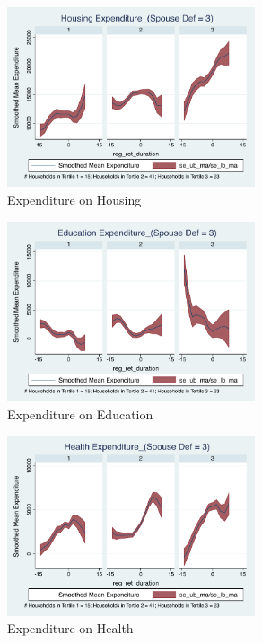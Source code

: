 \documentclass[11pt,onecolumn]{article}
\numberwithin{figure}{section}
\begin{document}
\clearpage

\begin{figure}[h]
	\caption{Expenditure on Housing}
	\centering
	\includegraphics[width=0.65\textwidth]{../ConsumptionPostRetirement_by_SpouseDef_Cats/Smoothed/3/spouse_def_total_housing_real.pdf}
\end{figure}


\begin{figure}[h]
	\caption{Expenditure on Education}
	\centering
	\includegraphics[width=0.65\textwidth]{../ConsumptionPostRetirement_by_SpouseDef_Cats/Smoothed/3/spouse_def_total_education_real.pdf}
\end{figure}
\clearpage

\begin{figure}[h]
	\caption{Expenditure on Health}
	\centering
	\includegraphics[width=0.65\textwidth]{../ConsumptionPostRetirement_by_SpouseDef_Cats/Smoothed/3/spouse_def_total_healthexpense_real.pdf}
\end{figure}
\end{document}
